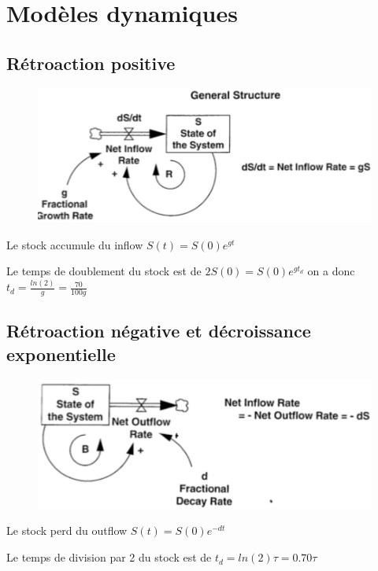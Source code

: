 \documentclass[resume]{subfiles}
\begin{document}
\section{Modèles dynamiques}
\subsection{Rétroaction positive}

\begin{figure}[H]
    \centering
    \includegraphics[width=1\columnwidth]{Figures/FDM_1.png}
\end{figure}

Le stock accumule du inflow $S(t)=S(0)e^{gt}$ 

Le temps de doublement du stock est de $2S(0)=S(0)e^{gt_d}$ on a donc $t_d=\frac{ln(2)}{g}=\frac{70}{100g}$

\subsection{Rétroaction négative et décroissance exponentielle}

\begin{figure}[H]
    \centering
    \includegraphics[width=1\columnwidth]{Figures/FDM_2.png}
\end{figure}

Le stock perd du outflow $S(t)=S(0)e^{-dt}$ 

Le temps de division par 2 du stock est de $t_d=ln(2)\tau=0.70\tau$ 
\end{document}
